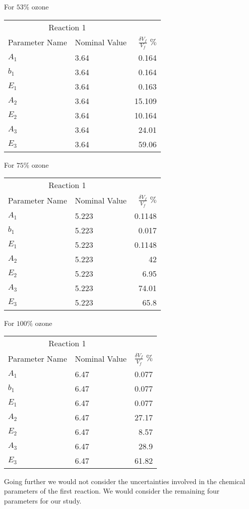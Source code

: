   
   For $53\%$ ozone
 
   \begin{tabular}{llr}  
    \toprule
    \multicolumn{2}{c}{Reaction 1} \\
    \cmidrule(r){1-2}
    Parameter Name  & Nominal Value &  $\frac{\delta V_f}{V_f}$ $\%$\\
    \midrule
    $A_1$      &  3.64   &  0.164   \\
    $b_1$      &  3.64   &  0.164    \\
    $E_1$      &  3.64   &  0.163     \\
    $A_2$      &  3.64   &  15.109       \\       
    $E_2$      &  3.64   &   10.164    \\
    $A_3$      &  3.64   &   24.01   \\       
    $E_3$      &  3.64   &   59.06   \\
    
    \bottomrule
  \end{tabular}
  
   For $75\%$ ozone
 
   \begin{tabular}{llr}  
    \toprule
    \multicolumn{2}{c}{Reaction 1} \\
    \cmidrule(r){1-2}
    Parameter Name  & Nominal Value &  $\frac{\delta V_f}{V_f}$ $\%$\\
    \midrule
    $A_1$      &  5.223   &  0.1148   \\
    $b_1$      &  5.223   &  0.017   \\
    $E_1$      &  5.223   &  0.1148     \\
    $A_2$      &  5.223   &  42       \\       
    $E_2$      &  5.223   &   6.95    \\
    $A_3$      &  5.223   &   74.01   \\       
    $E_3$      &  5.223   &   65.8   \\
    
    \bottomrule
  \end{tabular}
  
  
     For $100\%$ ozone
 
   \begin{tabular}{llr}  
    \toprule
    \multicolumn{2}{c}{Reaction 1} \\
    \cmidrule(r){1-2}
    Parameter Name  & Nominal Value &  $\frac{\delta V_f}{V_f}$ $\%$\\
    \midrule
    $A_1$      &  6.47   &  0.077   \\
    $b_1$      &  6.47   &  0.077   \\
    $E_1$      &  6.47   &  0.077     \\
    $A_2$      &  6.47  &    27.17       \\       
    $E_2$      &  6.47   &   8.57    \\
    $A_3$      &  6.47   &   28.9   \\       
    $E_3$      &  6.47   &   61.82   \\
    
    \bottomrule
  \end{tabular}
  
     

 Going further we would not consider the uncertainties involved in the
 chemical parameters of the first reaction. We would consider the
 remaining four parameters for our study.

